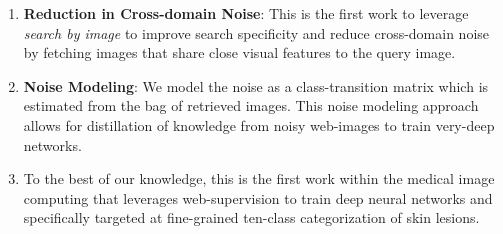 \documentclass{llncs}
\begin{document}
\begin{enumerate}[topsep=0pt,itemsep=-1ex,partopsep=1ex,parsep=1ex]
\item \textbf{Reduction in Cross-domain Noise}: This is the first work to leverage \textit{search by image} to improve search specificity and reduce cross-domain noise by fetching images that share close visual features to the query image.
\item \textbf{Noise Modeling}: We model the noise as a class-transition matrix which is estimated from the bag of retrieved images. This noise modeling approach allows for distillation of knowledge from noisy web-images to train very-deep networks. 
\item  To the best of our knowledge, this is the first work within the medical image computing that leverages web-supervision to train deep neural networks and specifically targeted at fine-grained ten-class categorization of skin lesions.
\end{enumerate}








\end{document}
